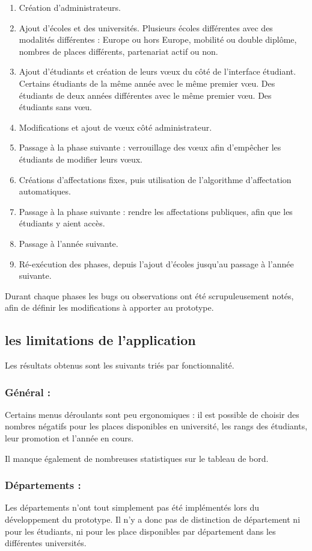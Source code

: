 \begin{enumerate}
\item Création d'administrateurs.
\item Ajout d'écoles et des universités. Plusieurs écoles différentes avec des modalités différentes : Europe ou hors Europe, mobilité ou double diplôme, nombres de places différents, partenariat actif ou non.
\item Ajout d'étudiants et création de leurs vœux du côté de l'interface étudiant. Certains étudiants de la même année avec le même premier vœu. Des étudiants de deux années différentes avec le même premier vœu. Des étudiants sans vœu.
\item Modifications et ajout de vœux côté administrateur.
\item Passage à la phase suivante : verrouillage des vœux afin d'empêcher les étudiants de modifier leurs vœux.
\item Créations d'affectations fixes, puis utilisation de l'algorithme d'affectation automatiques.
\item Passage à la phase suivante : rendre les affectations publiques, afin que les étudiants y aient accès. 
\item Passage à l'année suivante.
\item Ré-exécution des phases, depuis l'ajout d'écoles jusqu'au passage à l'année suivante.
\end{enumerate}


Durant chaque phases les bugs ou observations ont été scrupuleusement notés, afin de définir les modifications à apporter au prototype.


\subsection{les limitations de l'application}

Les résultats obtenus sont les suivants triés par fonctionnalité.

\subsubsection{Général :}
Certains menus déroulants sont peu ergonomiques : il est possible de choisir des nombres négatifs pour les places disponibles en université, les rangs des étudiants, leur promotion et l'année en cours.

Il manque également de nombreuses statistiques sur le tableau de bord.

\subsubsection{Départements :}
Les départements n'ont tout simplement pas été implémentés lors du développement du prototype. Il n'y a donc pas de distinction de département ni pour les étudiants, ni pour les place disponibles par département dans les différentes universités.


